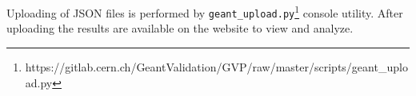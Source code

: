 Uploading of JSON files is performed by {\tt geant\_upload.py}\footnote{https://gitlab.cern.ch/GeantValidation/GVP/raw/master/scripts/geant\_upload.py} console utility.
After uploading the results are available on the website to view and analyze.




